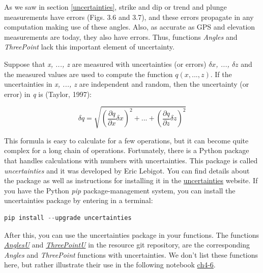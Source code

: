 \documentclass[a4paper , 12pt]{book}
\begin{document}
As we saw in section \ref{uncertainties}, strike and dip or trend and plunge measurements have errors (Figs. 3.6 and 3.7), and these errors  propagate in any computation making use of these angles. Also, as accurate as GPS and elevation measurements are today, they also have errors. Thus, functions \textit{Angles} and \textit{ThreePoint} lack this important element of uncertainty.

Suppose that \textit{x, ..., z} are measured with uncertainties (or errors) \textit{$\delta x$, ..., $\delta z$} and the measured values are used to compute the function $q(x,...,z)$. If the uncertainties in \textit{x, ..., z} are independent and random, then the uncertainty (or error) in \textit{q} is (Taylor, 1997):

\begin{equation}
    \delta q=\sqrt{\left(\frac{\partial q}{\partial x}\delta x \right)^2+...+\left(\frac{\partial q}{\partial z}\delta z \right)^2}\tag{4.16}
\end{equation}

This formula is easy to calculate for a few operations, but it can become quite complex for a long chain of operations. Fortunately, there is a Python package that handles calculations with numbers with uncertainties. This package is called \textit{uncertainties} and it was developed by Eric Lebigot. You can find details about the package as well as instructions for installing it in the \href{https://pythonhosted.org/uncertainties/}{uncertainties} website. If you have the Python \textit{pip} package-management system, you can install the uncertainties package by entering in a terminal:

\begin{center}
\begin{lstlisting}[language=Python, frame=single]
pip install --upgrade uncertainties
\end{lstlisting}
\end{center}

After this, you can use the uncertainties package in your functions. The functions \href{https://github.com/nfcd/compGeo/blob/master/source/functions/AnglesU.py}{\textit{AnglesU}} and \href{https://github.com/nfcd/compGeo/blob/master/source/functions/ThreePointU.py}{\textit{ThreePointU}} in the resource git repository, are the corresponding \textit{Angles} and \textit{ThreePoint} functions with uncertainties. We don't list these functions here, but rather illustrate their use in the following notebook \href{https://github.com/nfcd/compGeo/blob/master/source/notebooks/ch4-6.ipynb}{ch4-6}.
\end{document}
